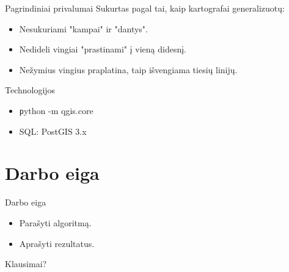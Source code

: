 \documentclass[14pt]{beamer}
\begin{document}
\begin{frame}{Pagrindiniai privalumai}
    Sukurtas pagal tai, kaip kartografai generalizuotų:
    \pause
    \begin{itemize}[<+->]
        \item Nesukuriami "kampai" ir "dantys".
        \item Nedideli vingiai "prastinami" į vieną didesnį.
        \item Nežymius vingius praplatina, taip išvengiama tiesių linijų.
    \end{itemize}
\end{frame}

\begin{frame}{Technologijos}
    \begin{itemize}[<+->]
        \item {\texttt python -m qgis.core}
        \item SQL: PostGIS 3.x
    \end{itemize}
\end{frame}

\section{Darbo eiga}

\begin{frame}{Darbo eiga}
    \begin{itemize}[<+->]
        \item Parašyti algoritmą.
        \item Aprašyti rezultatus.
    \end{itemize}
\end{frame}

\begin{frame}{Klausimai?}
\end{frame}
\end{document}
